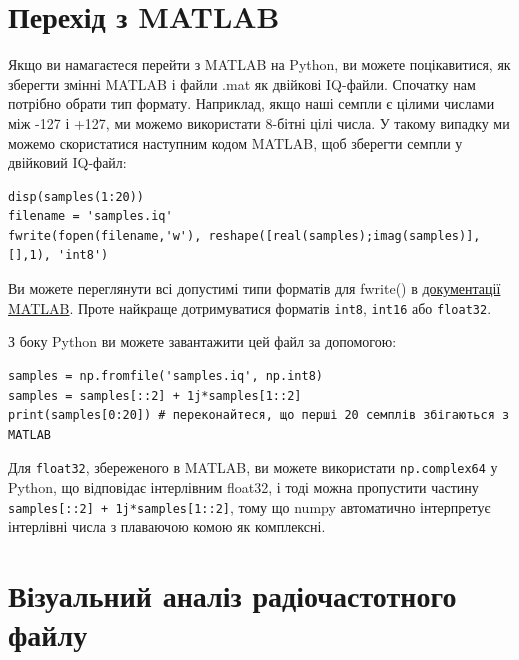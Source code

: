 \section{Перехід з
MATLAB}\label{ux43fux435ux440ux435ux445ux456ux434-ux437-matlab}

Якщо ви намагаєтеся перейти з MATLAB на Python, ви можете поцікавитися,
як зберегти змінні MATLAB і файли .mat як двійкові IQ-файли. Спочатку
нам потрібно обрати тип формату. Наприклад, якщо наші семпли є цілими
числами між -127 і +127, ми можемо використати 8-бітні цілі числа. У
такому випадку ми можемо скористатися наступним кодом MATLAB, щоб
зберегти семпли у двійковий IQ-файл:

\begin{Verbatim}[breaklines=true,breakanywhere=true,fontsize=\small]
% припустимо, що наші IQ-семпли містяться у змінній samples
disp(samples(1:20))
filename = 'samples.iq'
fwrite(fopen(filename,'w'), reshape([real(samples);imag(samples)],[],1), 'int8')
\end{Verbatim}

Ви можете переглянути всі допустимі типи форматів для fwrite() в
\href{https://www.mathworks.com/help/matlab/ref/fwrite.html\#buakf91-1-precision}{документації
MATLAB}. Проте найкраще дотримуватися форматів
\texttt{\textquotesingle{}int8\textquotesingle{}},
\texttt{\textquotesingle{}int16\textquotesingle{}} або
\texttt{\textquotesingle{}float32\textquotesingle{}}.

З боку Python ви можете завантажити цей файл за допомогою:

\begin{Verbatim}[breaklines=true,breakanywhere=true,fontsize=\small]
samples = np.fromfile('samples.iq', np.int8)
samples = samples[::2] + 1j*samples[1::2]
print(samples[0:20]) # переконайтеся, що перші 20 семплів збігаються з MATLAB
\end{Verbatim}

Для \texttt{\textquotesingle{}float32\textquotesingle{}}, збереженого в
MATLAB, ви можете використати \texttt{np.complex64} у Python, що
відповідає інтерлівним float32, і тоді можна пропустити частину
\texttt{samples{[}::2{]}\ +\ 1j*samples{[}1::2{]}}, тому що numpy
автоматично інтерпретує інтерлівні числа з плаваючою комою як
комплексні.

\section{Візуальний аналіз радіочастотного
файлу}\label{ux432ux456ux437ux443ux430ux43bux44cux43dux438ux439-ux430ux43dux430ux43bux456ux437-ux440ux430ux434ux456ux43eux447ux430ux441ux442ux43eux442ux43dux43eux433ux43e-ux444ux430ux439ux43bux443}

